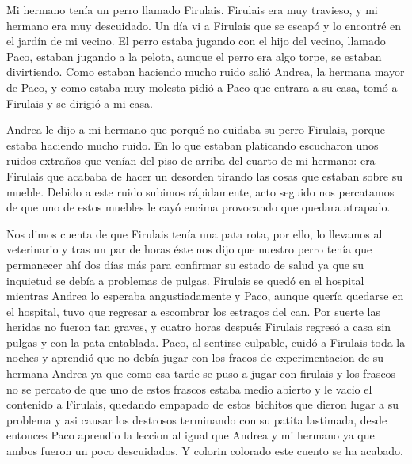 \documentclass{article}
\begin{document}
Mi hermano tenía un perro llamado Firulais. Firulais era muy travieso, y mi hermano era muy descuidado. Un día vi a Firulais que se escapó y lo encontré en el jardín de mi vecino.
El perro estaba jugando con el hijo del vecino, llamado Paco, estaban jugando a la pelota, aunque el perro era algo torpe, se estaban divirtiendo. Como estaban haciendo mucho ruido salió Andrea, la hermana mayor de Paco, y como estaba muy molesta pidió a Paco que entrara a su casa, tomó a Firulais y se dirigió a mi casa.

Andrea le dijo a mi hermano que porqué no cuidaba su perro Firulais, porque estaba haciendo mucho ruido. En lo que estaban platicando escucharon unos ruidos extraños que venían del piso de arriba del cuarto de mi hermano: era Firulais que acababa de hacer un desorden tirando las cosas que estaban sobre su mueble. Debido a este ruido subimos rápidamente, acto seguido nos percatamos de que uno de estos muebles le cayó encima provocando que quedara atrapado.

Nos dimos cuenta de que Firulais tenía una pata rota, por ello, lo
llevamos al veterinario y tras un par de horas éste nos dijo que
nuestro perro tenía que permanecer ahí dos días más para confirmar su
estado de salud ya que su inquietud se debía a problemas de
pulgas. Firulais se quedó en el hospital mientras Andrea lo esperaba
angustiadamente y Paco, aunque quería quedarse en el hospital, tuvo
que regresar a escombrar los estragos del can. 
Por suerte las heridas no fueron tan graves, y cuatro horas después Firulais regresó a casa sin pulgas y con la pata
entablada. Paco, al sentirse culpable, cuidó a Firulais toda la noches  
y  aprendió que no debía jugar con los fracos de experimentacion de su hermana Andrea ya que como esa tarde se puso a jugar con firulais y los frascos no se percato de que uno de estos frascos estaba medio abierto y le vacio el contenido a Firulais, quedando empapado de estos bichitos que dieron lugar a su problema y asi causar los destrosos terminando con su patita lastimada, desde entonces Paco aprendio la leccion al igual que Andrea y mi hermano ya que ambos fueron un poco descuidados. Y colorin colorado este cuento se ha acabado.
\end{document}
